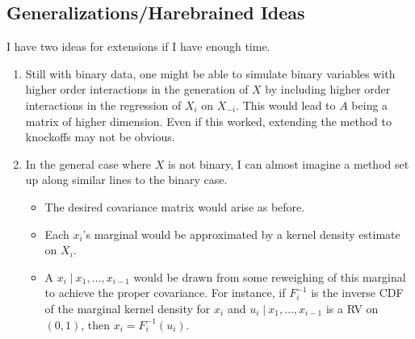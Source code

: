 \documentclass[11pt]{article}
\newcommand{\st}{ \; \big | \:}
\theoremstyle{definition}
\begin{document}
\subsection{Generalizations/Harebrained Ideas}
I have two ideas for extensions if I have enough time.
\begin{enumerate}
    \item Still with binary data, one might be able to simulate binary variables with higher order interactions in the generation of $X$ by including higher order interactions in the regression of $X_i$ on $X_{-i}$. This would lead to $A$ being a matrix of higher dimension. Even if this worked, extending the method to knockoffs may not be obvious.
    \item In the general case where $X$ is not binary, I can almost imagine a method set up along similar lines to the binary case.
    \begin{itemize}
        \item The desired covariance matrix would arise as before.
        \item Each $x_i$'s marginal would be approximated by a kernel density estimate on $X_i$.
        \item A $x_i \st x_1, \ldots, x_{i-1}$ would be drawn from some reweighing of this marginal to achieve the proper covariance. For instance, if $F_i^{-1}$ is the inverse CDF of the marginal kernel density for $x_i$ and $u_i\st x_1, \ldots, x_{i-1}$ is a RV on $(0,1)$, then $x_i=F_i^{-1}(u_i)$.
    \end{itemize}
\end{enumerate}



    
\end{document}
